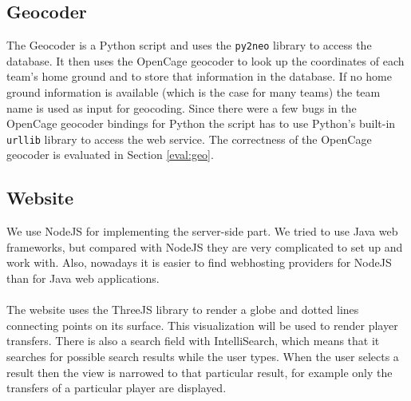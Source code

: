 \documentclass{article}
\begin{document}
\subsection{Geocoder}

The Geocoder is a Python script and uses the \verb+py2neo+ library to access the database. It then uses the OpenCage geocoder \cite{OpenCage} to look up the coordinates of each team's home ground and to store that information in the database. If no home ground information is available (which is the case for many teams) the team name is used as input for geocoding. Since there were a few bugs in the OpenCage geocoder bindings for Python the script has to use Python's built-in \verb+urllib+ library to access the web service. The correctness of the OpenCage geocoder is evaluated in Section \ref{eval:geo}.

\subsection{Website}

We use NodeJS \cite{NodeJS} for implementing the server-side part. We tried to use Java web frameworks, but compared with NodeJS they are very complicated to set up and work with. Also, nowadays it is easier to find webhosting providers for NodeJS than for Java web applications.
\\ \\
The website uses the ThreeJS library \cite{ThreeJS} to render a globe and dotted lines connecting points on its surface. This visualization will be used to render player transfers. There is also a search field with IntelliSearch, which means that it searches for possible search results while the user types. When the user selects a result then the view is narrowed to that particular result, for example only the transfers of a particular player are displayed.
\end{document}
